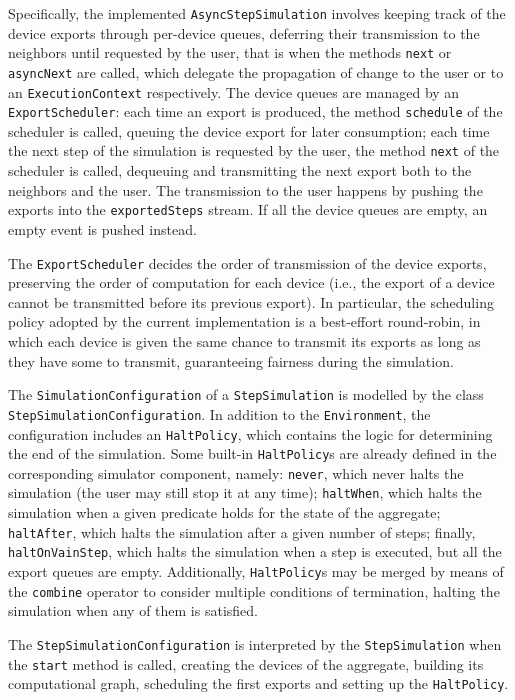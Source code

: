 Specifically, the implemented \texttt{AsyncStepSimulation} involves keeping
track of the device exports through per-device queues, deferring their
transmission to the neighbors until requested by the user, that is when the
methods \texttt{next} or \texttt{asyncNext} are called, which delegate the
propagation of change to the user or to an \texttt{ExecutionContext}
respectively. The device queues are managed by an \texttt{ExportScheduler}:
each time an export is produced, the method \texttt{schedule} of the scheduler
is called, queuing the device export for later consumption; each time the next
step of the simulation is requested by the user, the method \texttt{next} of
the scheduler is called, dequeuing and transmitting the next export both to the
neighbors and the user. The transmission to the user happens by pushing the
exports into the \texttt{exportedSteps} stream. If all the device queues are
empty, an empty event is pushed instead.

The \texttt{ExportScheduler} decides the order of transmission of the device
exports, preserving the order of computation for each device (i.e., the export
of a device cannot be transmitted before its previous export). In particular,
the scheduling policy adopted by the current implementation is a best-effort
round-robin, in which each device is given the same chance to transmit its
exports as long as they have some to transmit, guaranteeing fairness during the
simulation.

The \texttt{SimulationConfiguration} of a \texttt{StepSimulation} is modelled
by the class \texttt{StepSimulationConfiguration}. In addition to the
\texttt{Environment}, the configuration includes an \texttt{HaltPolicy}, which
contains the logic for determining the end of the simulation. Some built-in
\texttt{HaltPolicy}s are already defined in the corresponding simulator
component, namely: \texttt{never}, which never halts the simulation (the user
may still stop it at any time); \texttt{haltWhen}, which halts the simulation
when a given predicate holds for the state of the aggregate;
\texttt{halt\-After}, which halts the simulation after a given number of steps;
finally, \texttt{haltOnVainStep}, which halts the simulation when a step is
executed, but all the export queues are empty. Additionally,
\texttt{HaltPolicy}s may be merged by means of the \texttt{combine} operator to
consider multiple conditions of termination, halting the simulation when any of
them is satisfied.

The \texttt{StepSimulationConfiguration} is interpreted by the
\texttt{StepSimulation} when the \texttt{start} method is called, creating the
devices of the aggregate, building its computational graph, scheduling the
first exports and setting up the \texttt{HaltPolicy}.

